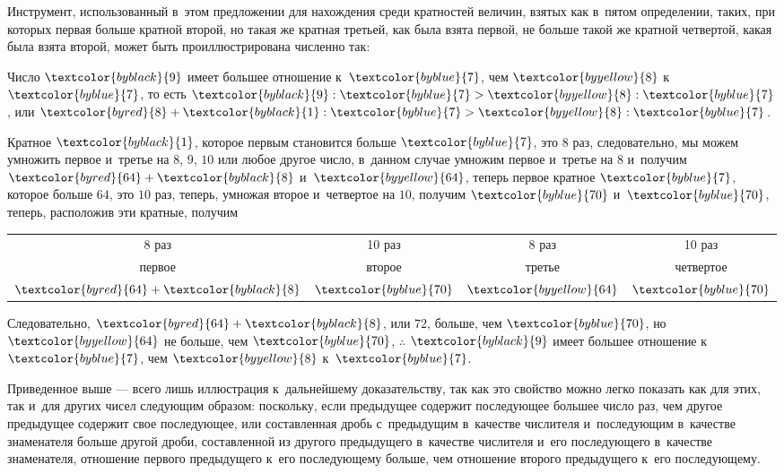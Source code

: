\documentclass[letters,booklanguage=russian]{byrnebook}
\begin{document}
Инструмент, использованный в~этом предложении для нахождения среди кратностей величин, взятых как в~пятом определении, таких, при которых первая больше кратной второй, но такая же кратная третьей, как была взята первой, не больше такой же кратной четвертой, какая была взята второй, может быть проиллюстрирована численно так:

Число $\textcolor{byblack}{9}$ имеет большее отношение к~$\textcolor{byblue}{7}$, чем $\textcolor{byyellow}{8}$ к~$\textcolor{byblue}{7}$, то есть $\textcolor{byblack}{9} : \textcolor{byblue}{7} > \textcolor{byyellow}{8} : \textcolor{byblue}{7}$, или $\textcolor{byred}{8} + \textcolor{byblack}{1} : \textcolor{byblue}{7} > \textcolor{byyellow}{8} : \textcolor{byblue}{7}$.

Кратное $\textcolor{byblack}{1}$, которое первым становится больше $\textcolor{byblue}{7}$, это $8$ раз, следовательно, мы можем умножить первое и~третье на $8$, $9$, $10$ или любое другое число, в~данном случае умножим первое и~третье на $8$ и~получим $\textcolor{byred}{64} + \textcolor{byblack}{8}$ и~$\textcolor{byyellow}{64}$, теперь первое кратное $\textcolor{byblue}{7}$, которое больше $64$, это $10$ раз, теперь, умножая второе и~четвертое на $10$, получим $\textcolor{byblue}{70}$ и~$\textcolor{byblue}{70}$, теперь, расположив эти кратные, получим

\begin{center}
\begin{tabular}{c c c c}
{\footnotesize 8 раз} & {\footnotesize 10 раз} & {\footnotesize 8 раз} & {\footnotesize 10 раз} \\
{\footnotesize первое} & {\footnotesize второе} & {\footnotesize третье} & {\footnotesize четвертое} \\
$\textcolor{byred}{64} + \textcolor{byblack}{8}$ & $\textcolor{byblue}{70}$ & $\textcolor{byyellow}{64}$ & $\textcolor{byblue}{70}$ \\
\end{tabular}
\end{center}

Следовательно, $\textcolor{byred}{64} + \textcolor{byblack}{8}$, или $72$, больше, чем $\textcolor{byblue}{70}$, но $\textcolor{byyellow}{64}$ не больше, чем $\textcolor{byblue}{70}$, $\therefore$  $\textcolor{byblack}{9}$ имеет большее отношение к~$\textcolor{byblue}{7}$, чем $\textcolor{byyellow}{8}$ к~$\textcolor{byblue}{7}$.

Приведенное выше — всего лишь иллюстрация к~дальнейшему доказательству, так как это свойство можно легко показать как для этих, так и~для других чисел следующим образом: поскольку, если предыдущее содержит последующее большее число раз, чем другое предыдущее содержит свое последующее, или  составленная дробь с~предыдущим в~качестве числителя и~последующим в~качестве знаменателя больше другой дроби, составленной из другого предыдущего в~качестве числителя и~его последующего в~качестве знаменателя, отношение первого предыдущего к~его последующему больше, чем отношение второго предыдущего к~его последующему.
\end{document}
